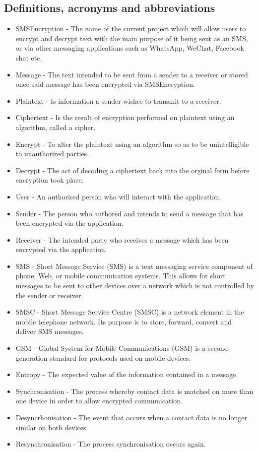 \subsection{Definitions, acronyms and abbreviations}
\begin{itemize}
\item SMSEncryption - The name of the current project which will allow users to encrypt and decrypt text with the main purpose of it being sent as an SMS, or via other messaging applications such as WhatsApp, WeChat, Facebook chat etc.
\item Message - The text intended to be sent from a sender to a receiver  or stored once said message has been encrypted via SMSEncryption.
\item Plaintext -  Is information a sender wishes to transmit to a receiver. 
\item Ciphertext - Is the result of encryption performed on plaintext using an algorithm, called a cipher.
\item Encrypt -  To alter the plaintext using an algorithm so as to be unintelligible to unauthorized parties.
\item Decrypt - The act of decoding a ciphertext back into the orginal form before encryption took place.
\item User - An authorised person who will interact with the application.
\item Sender - The person who authored and intends to send a message that has been encrypted via the application.
\item Receiver - The intended party who receives a message which has been encrypted via the application.
\item SMS - Short Message Service (SMS) is a text messaging service component of phone, Web, or mobile communication systems. This allows for short messages to be sent to other devices over a network which is not controlled by the sender or receiver.
\item SMSC - Short Message Service Centre (SMSC) is a network element in the mobile telephone network. Its purpose is to store, forward, convert and deliver SMS messages.
\item GSM - Global System for Mobile Communications (GSM) is a second generation standard for protocols used on mobile devices.
\item Entropy -  The expected value of the information contained in a message.
\item Synchronisation - The process whereby contact data is matched on more than one device in order to allow encrypted communication.
\item Desyncrhonisation - The event that occurs when a contact data is no longer similar on both devices.
\item Resynchronisation - The process synchronisation occurs again.

\end{itemize}

